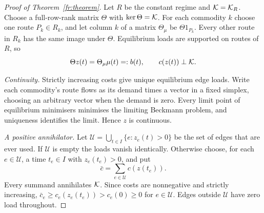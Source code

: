 \begin{proof}[Proof of Theorem~\ref{fr:theorem}]
Let $R$ be the constant regime and $\mathcal K=\mathcal K_R$. Choose a full-row-rank matrix $\Theta$ with $\ker\Theta=\mathcal K$. For each commodity $k$ choose one route $P_k\in R_k$, and let column $k$ of a matrix $\Theta_\mu$ be $\Theta1_{P_k}$. Every other route in $R_k$ has the same image under $\Theta$. Equilibrium loads are supported on routes of $R$, so
\begin{equation}\label{fr:affine}
 \Theta z(t)=\Theta_\mu\mu(t)=:b(t),\qquad c(z(t))\perp\mathcal K.
\end{equation}

\emph{Continuity.} Strictly increasing costs give unique equilibrium edge loads. Write each commodity's route flows as its demand times a vector in a fixed simplex, choosing an arbitrary vector when the demand is zero. Every limit point of equilibrium minimisers minimises the limiting Beckmann problem, and uniqueness identifies the limit. Hence $z$ is continuous.

\emph{A positive annihilator.} Let $\mathcal U=\bigcup_{t\in I}\{e:z_e(t)>0\}$ be the set of edges that are ever used. If $\mathcal U$ is empty the loads vanish identically. Otherwise choose, for each $e\in\mathcal U$, a time $t_e\in I$ with $z_e(t_e)>0$, and put
\begin{equation}\label{fr:positive_annihilator}
 \bar c=\sum_{e\in\mathcal U}c(z(t_e)).
\end{equation}
Every summand annihilates $\mathcal K$. Since costs are nonnegative and strictly increasing, $\bar c_e\ge c_e(z_e(t_e))>c_e(0)\ge0$ for $e\in\mathcal U$. Edges outside $\mathcal U$ have zero load throughout.


\end{proof}
